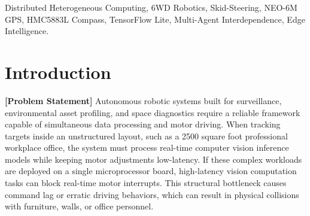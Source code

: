\documentclass[conference]{IEEEtran}
\begin{document}
\begin{abstract}
This project paper presents the architectural framework, financial parameters, physical deployment, and multi-layered software synchronization of an autonomous indoor security and surveillance 6-Wheel Drive (6WD) robotic rover. Modern edge surveillance requires the simultaneous processing of high-frequency environmental telemetry and localized deep-learning computer vision tracking matrices. Single-processor configurations frequently suffer from software thread starvation, driving latency, or data corruption induced by high-current motor back-EMF noise. To resolve these execution barriers, we present a distributed heterogeneous computing configuration separating tasks across three distinct layers: a Host Node (Raspberry Pi 4) hosting a Flask web engine and a local TensorFlow Lite SSD MobileNet v2 image interpreter; an Intermediate Sensory Aggregator Node (ESP32) managing an integrated NEO-6M GPS, HMC5883L digital compass, and a 360-degree virtual barrier matrix; and a real-time Execution Node (Arduino Uno) controlling three dual H-bridge drivers via physical channel jumping. The implemented platform runs edge vision inference at 18--22 FPS while keeping command latency under 45 milliseconds, achieving a highly responsive zero-radius skid-steering platform optimized for structural mapping within complex facility layouts.
\end{abstract}

\begin{IEEEkeywords}
Distributed Heterogeneous Computing, 6WD Robotics, Skid-Steering, NEO-6M GPS, HMC5883L Compass, TensorFlow Lite, Multi-Agent Interdependence, Edge Intelligence.
\end{IEEEkeywords}

\section{Introduction}
\textbf{[Problem Statement]} Autonomous robotic systems built for  surveillance, environmental asset profiling, and space diagnostics require a reliable framework capable of simultaneous data processing and motor driving. When tracking targets inside an unstructured layout, such as a 2500 square foot professional workplace office, the system must process real-time computer vision inference models while keeping motor adjustments low-latency. If these complex workloads are deployed on a single microprocessor board, high-latency vision computation tasks can block real-time motor interrupts. This structural bottleneck causes command lag or erratic driving behaviors, which can result in physical collisions with furniture, walls, or office personnel.
\end{document}
